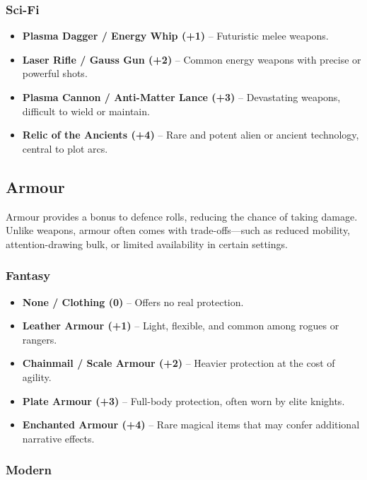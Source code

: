 \begin{multicols}{2}
\subsubsection*{Sci-Fi}

\begin{itemize}
  \item \textbf{Plasma Dagger / Energy Whip (+1)} – Futuristic melee weapons.
  \item \textbf{Laser Rifle / Gauss Gun (+2)} – Common energy weapons with precise or powerful shots.
  \item \textbf{Plasma Cannon / Anti-Matter Lance (+3)} – Devastating weapons, difficult to wield or maintain.
  \item \textbf{Relic of the Ancients (+4)} – Rare and potent alien or ancient technology, central to plot arcs.
\end{itemize}

\subsection{Armour}

Armour provides a bonus to defence rolls, reducing the chance of taking damage. Unlike weapons, armour often comes with trade-offs—such as reduced mobility, attention-drawing bulk, or limited availability in certain settings.

\subsubsection*{Fantasy}

\begin{itemize}
  \item \textbf{None / Clothing (0)} – Offers no real protection.
  \item \textbf{Leather Armour (+1)} – Light, flexible, and common among rogues or rangers.
  \item \textbf{Chainmail / Scale Armour (+2)} – Heavier protection at the cost of agility.
  \item \textbf{Plate Armour (+3)} – Full-body protection, often worn by elite knights.
  \item \textbf{Enchanted Armour (+4)} – Rare magical items that may confer additional narrative effects.
\end{itemize}

\subsubsection*{Modern}


\end{multicols}
